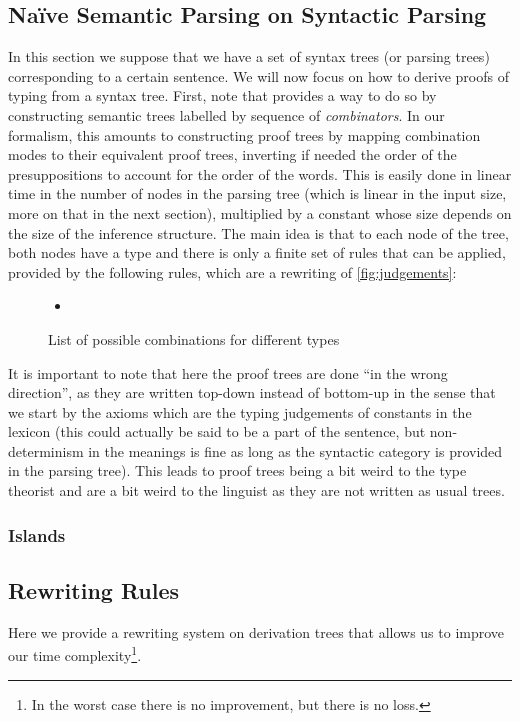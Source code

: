 \documentclass[math, english, info]{cours}
\begin{document}
\subsection{Naïve Semantic Parsing on Syntactic Parsing}
In this section we suppose that we have a set of syntax trees (or parsing trees) corresponding to a certain sentence.
We will now focus on how to derive proofs of typing from a syntax tree.
First, note that \cite{bumfordEffectdrivenInterpretationFunctors2025} provides a way to do so by constructing
semantic trees labelled by sequence of \emph{combinators}.
In our formalism, this amounts to constructing proof trees by mapping combination modes to their equivalent proof
trees, inverting if needed the order of the presuppositions to account for the order of the words.
This is easily done in linear time in the number of nodes in the parsing tree (which is linear in the input size,
more on that in the next section), multiplied by a constant whose size depends on the size of the inference
structure.
The main idea is that to each node of the tree, both nodes have a type and there is only a finite set of rules
that can be applied, provided by the following rules, which are a rewriting of \ref{fig:judgements}:
\begin{figure}
	\centering
	\begin{itemize}
		\item
	\end{itemize}
	\caption{List of possible combinations for different types}
	\label{fig:proof-trees}
\end{figure}
It is important to note that here the proof trees are done ``in the wrong direction'', as they are written top-down
instead of bottom-up in the sense that we start by the axioms which are the typing judgements of constants in the
lexicon (this could actually be said to be a part of the sentence, but non-determinism in the meanings is fine as
long as the syntactic category is provided in the parsing tree).
This leads to proof trees being a bit weird to the type theorist and are a bit weird to the linguist as they are
not written as usual trees.

\subsubsection{Islands}

\subsection{Rewriting Rules}
Here we provide a rewriting system on derivation trees that allows us to improve our time complexity\footnote{In
the worst case there is no improvement, but there is no loss.}.
\end{document}
